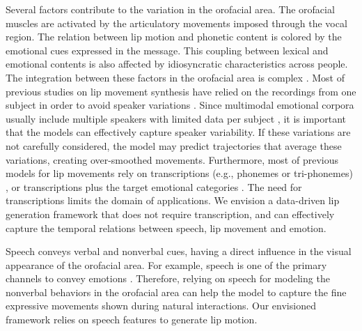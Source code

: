 \documentclass[10pt,journal,compsoc]{IEEEtran}
\begin{document}
Several factors contribute to the variation in the orofacial area. The orofacial muscles are activated by the articulatory movements imposed through the vocal region. The relation between lip motion and phonetic content is colored by the emotional cues expressed in the message. This coupling between lexical and emotional contents is also affected by idiosyncratic characteristics across people. The integration between these factors in the orofacial area is complex \cite{Mariooryad_2013, Busso_2006}. Most of previous studies on lip movement synthesis have relied on the recordings from one subject in order to avoid speaker variations \cite{Taylor_2016, Karras_2017, Anderson_2013}. Since multimodal emotional corpora usually include multiple speakers with limited data per subject \cite{Li_2016_2}, it is important that the models can effectively capture speaker variability. If these variations are not carefully considered, the model may predict trajectories that average these variations, creating over-smoothed movements. Furthermore, most of previous models for lip movements rely on transcriptions (e.g., phonemes or tri-phonemes) \cite{Taylor_2017,Xu_2013,Deng_2005_2}, or transcriptions plus the target emotional categories \cite{Cao_2005, Parker_2017, Anderson_2013}. The need for transcriptions limits the domain of applications. We envision a data-driven lip generation framework that does not require transcription, and can effectively capture the temporal relations between speech, lip movement and emotion.

Speech conveys verbal and nonverbal cues, having a direct influence in the visual appearance of the orofacial area. For example, speech is one of the primary channels to convey emotions \cite{Lee_2014_2}. Therefore, relying on speech for modeling the nonverbal behaviors in the orofacial area can help the model to capture the fine expressive movements shown during natural interactions. Our envisioned framework relies on speech features to generate lip motion. 
\end{document}
